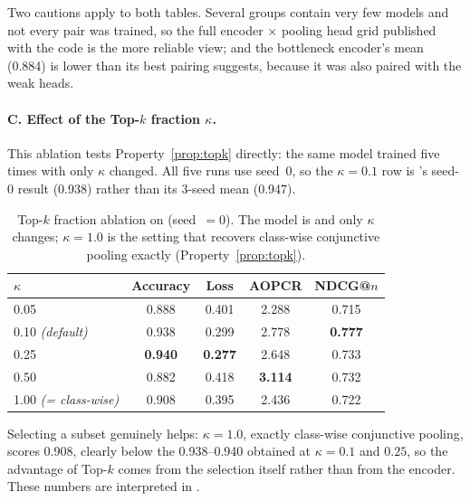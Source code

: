 Two cautions apply to both tables. Several groups contain very few models and not every pair was
trained, so the full encoder $\times$ pooling head grid published with the code is the more reliable
view; and the bottleneck encoder's mean (0.884) is lower than its best pairing suggests, because it
was also paired with the weak heads.

\paragraph{C. Effect of the Top-$k$ fraction $\kappa$.}
This ablation tests Property~\ref{prop:topk} directly: the same model trained five times with only
$\kappa$ changed. All five runs use seed~0, so the $\kappa = 0.1$ row is \mbot{}'s seed-0 result
(0.938) rather than its 3-seed mean (0.947).

\begin{table}[htbp]
\caption{Top-$k$ fraction ablation on \webtraffic{} (seed~$=0$). The model is \mbot{} and only
$\kappa$ changes; $\kappa = 1.0$ is the setting that recovers class-wise conjunctive pooling exactly
(Property~\ref{prop:topk}).}
\label{tab:ablation_topk}
\begin{center}
\small
\begin{tabular}{lcccc}
\toprule
\textbf{$\kappa$} & \textbf{Accuracy} & \textbf{Loss} & \textbf{AOPCR} & \textbf{NDCG@$n$} \\
\midrule
0.05                    & 0.888 & 0.401 & 2.288 & 0.715 \\
0.10 \emph{(default)}   & 0.938 & 0.299 & 2.778 & \textbf{0.777} \\
0.25                    & \textbf{0.940} & \textbf{0.277} & 2.648 & 0.733 \\
0.50                    & 0.882 & 0.418 & \textbf{3.114} & 0.732 \\
1.00 \emph{(= class-wise)} & 0.908 & 0.395 & 2.436 & 0.722 \\
\bottomrule
\end{tabular}
\end{center}
\end{table}

Selecting a subset genuinely helps: $\kappa = 1.0$, exactly class-wise conjunctive pooling, scores
0.908, clearly below the 0.938--0.940 obtained at $\kappa = 0.1$ and $0.25$, so the advantage of
Top-$k$ comes from the selection itself rather than from the encoder. These numbers are interpreted
in .

